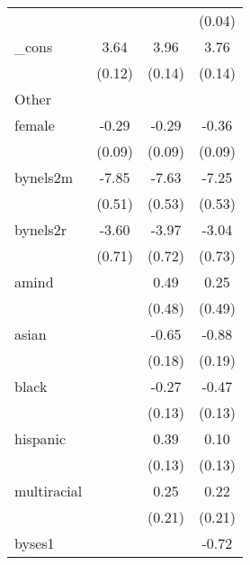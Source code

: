 {\begin{tabular}{l*{3}{c}}
            &                     &                     &      (0.04)         \\
[1em]
\_cons      &        3.64\sym{***}&        3.96\sym{***}&        3.76\sym{***}\\
            &      (0.12)         &      (0.14)         &      (0.14)         \\
\hline
Other       &                     &                     &                     \\
female      &       -0.29\sym{**} &       -0.29\sym{**} &       -0.36\sym{***}\\
            &      (0.09)         &      (0.09)         &      (0.09)         \\
[1em]
bynels2m    &       -7.85\sym{***}&       -7.63\sym{***}&       -7.25\sym{***}\\
            &      (0.51)         &      (0.53)         &      (0.53)         \\
[1em]
bynels2r    &       -3.60\sym{***}&       -3.97\sym{***}&       -3.04\sym{***}\\
            &      (0.71)         &      (0.72)         &      (0.73)         \\
[1em]
amind       &                     &        0.49         &        0.25         \\
            &                     &      (0.48)         &      (0.49)         \\
[1em]
asian       &                     &       -0.65\sym{***}&       -0.88\sym{***}\\
            &                     &      (0.18)         &      (0.19)         \\
[1em]
black       &                     &       -0.27\sym{*}  &       -0.47\sym{***}\\
            &                     &      (0.13)         &      (0.13)         \\
[1em]
hispanic    &                     &        0.39\sym{**} &        0.10         \\
            &                     &      (0.13)         &      (0.13)         \\
[1em]
multiracial &                     &        0.25         &        0.22         \\
            &                     &      (0.21)         &      (0.21)         \\
[1em]
byses1      &                     &                     &       -0.72\sym{***}\\

\end{tabular}}

